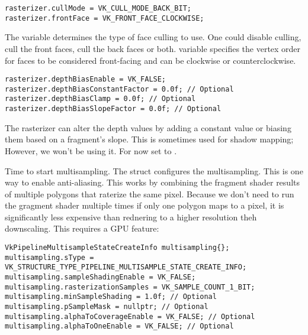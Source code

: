 \begin{center}
\begin{minipage}{0.95\linewidth}
\begin{lstlisting}
rasterizer.cullMode = VK_CULL_MODE_BACK_BIT;
rasterizer.frontFace = VK_FRONT_FACE_CLOCKWISE;
\end{lstlisting}
\end{minipage}
\end{center}

\par The  variable determines the type of face culling to use. One could disable culling, cull the front faces, cull the back faces or both.  variable specifies the vertex order for faces to be considered front-facing and can be clockwise or counterclockwise.

\begin{center}
\begin{minipage}{0.95\linewidth}
\begin{lstlisting}
rasterizer.depthBiasEnable = VK_FALSE;
rasterizer.depthBiasConstantFactor = 0.0f; // Optional
rasterizer.depthBiasClamp = 0.0f; // Optional
rasterizer.depthBiasSlopeFactor = 0.0f; // Optional
\end{lstlisting}
\end{minipage}
\end{center}

\par The rasterizer can alter the depth values by adding a constant value or biasing them based on a fragment's slope. This is sometimes used for shadow mapping; However, we won't be using it. For now set  to .

\par Time to start multisampling. The  struct configures the multisampling. This is one way to enable anti-aliasing. This works by combining the fragment shader results of multiple polygons that raterize the same pixel. Because we don't need to run the gragment shader multiple times if only one polygon maps to a pixel, it is significantly less expensive than rednering to a higher resolution theh downscaling. This requires a GPU feature:

\begin{center}
\begin{minipage}{0.95\linewidth}
\begin{lstlisting}
VkPipelineMultisampleStateCreateInfo multisampling{};
multisampling.sType = VK_STRUCTURE_TYPE_PIPELINE_MULTISAMPLE_STATE_CREATE_INFO;
multisampling.sampleShadingEnable = VK_FALSE;
multisampling.rasterizationSamples = VK_SAMPLE_COUNT_1_BIT;
multisampling.minSampleShading = 1.0f; // Optional
multisampling.pSampleMask = nullptr; // Optional
multisampling.alphaToCoverageEnable = VK_FALSE; // Optional
multisampling.alphaToOneEnable = VK_FALSE; // Optional
\end{lstlisting}
\end{minipage}
\end{center}

